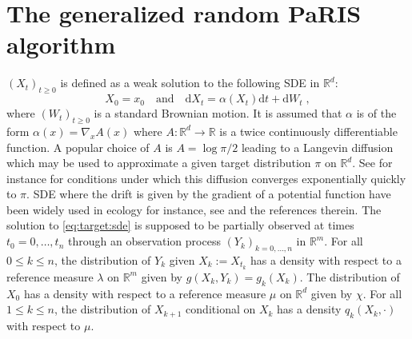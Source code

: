 \documentclass[12pt]{article}
\newcommand{\rmd}{\mathrm{d}}
\newcommand{\eqsp}{\;}
\newcommand{\1}{\mathrm{1}}
\newcommand{\qk}{q_{k}}
\begin{document}
\section{The generalized random PaRIS algorithm}
\label{sec:rwparis}
$(X_t)_{t\ge 0}$ is defined as a weak solution to the following SDE in $\mathbb{R}^d$:
\begin{equation}
\label{eq:target:sde}
X_0 = x_0\quad\mbox{and}\quad \rmd X_t = \alpha(X_t)\rmd t + \rmd W_t\eqsp,
\end{equation}
where $(W_t)_{t\ge 0}$ is a standard Brownian motion. It is assumed that $\alpha$ is of the form $\alpha(x) = \nabla_x A(x)$ where $A: \mathbb{R}^d \to \mathbb{R}$ is a twice continuously differentiable function. 
A popular choice of $A$  is $A = \log \pi/2$ leading to a Langevin diffusion which may be used to approximate a given target distribution $\pi$ on $\mathbb{R}^d$. See for instance \cite{roberts:tweedie:1996} for conditions under which this diffusion converges exponentially quickly to $\pi$. 
SDE where the drift is given by the gradient of a potential function have been widely used in ecology for instance, see \cite{brillinger:et:al:2011,harris:blackwell:2013,preisler:et:al:2013} and the references therein. The solution to \eqref{eq:target:sde} is supposed to be partially observed at times $t_0=0,\dots,t_n$ through an observation process $(Y_k)_{k=0,\dots,n}$ in $\mathbb{R}^m$. 
For all $0\le k \le n$, the distribution of $Y_k$ given $X_k:= X_{t_k}$ has a density with respect to a reference measure $\lambda$ on $\mathbb{R}^m$ given by $g(X_k,Y_k) = g_k(X_k)$. 
The distribution of $X_0$ has a density with respect to a reference measure $\mu$ on $\mathbb{R}^d$ given by $\chi$.
For all $1\le k \le n$, the distribution of $X_{k+1} $ conditional on $X_{k}$ has a density $\qk(X_{k},\cdot)$ with respect to $\mu$.
 
\end{document}
